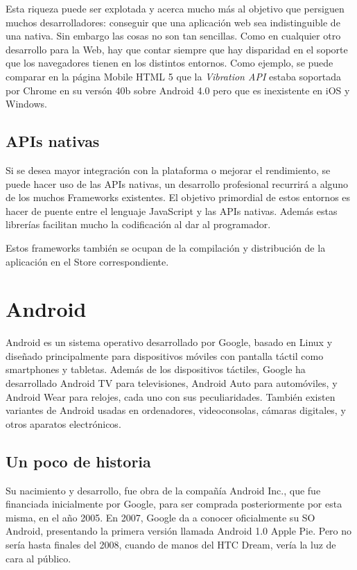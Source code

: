 \documentclass[
10pt, %
a4paper, %
oneside, %
headinclude,footinclude, %
BCOR5mm, %
]{scrartcl}
\begin{document}
Esta riqueza puede ser explotada y acerca mucho más al objetivo que persiguen muchos desarrolladores: conseguir que una aplicación web sea indistinguible de una nativa. Sin embargo las cosas no son tan sencillas. Como en cualquier otro desarrollo para la Web, hay que contar siempre que hay disparidad en el soporte que los navegadores tienen en los distintos entornos. Como ejemplo, se puede comparar en la página Mobile HTML 5 \cite{maximiliano_firtman_html5_2015} que la \textit{Vibration API} estaba soportada por Chrome en su versón 40b sobre Android 4.0 pero que es inexistente en iOS y Windows.

\subsection{APIs nativas}
Si se desea mayor integración con la plataforma o mejorar el rendimiento, se puede hacer uso de las APIs nativas, un desarrollo profesional recurrirá a alguno de los muchos Frameworks existentes. El objetivo primordial de estos entornos es hacer de puente entre el lenguaje JavaScript y las APIs nativas. Además estas librerías facilitan mucho la codificación al dar al programador.

Estos frameworks también se ocupan de la compilación y distribución de la aplicación en el Store correspondiente.

\section{Android}
Android es un sistema operativo desarrollado por Google, basado en Linux y diseñado principalmente para dispositivos móviles con pantalla táctil como smartphones y tabletas. Además de los dispositivos táctiles, Google ha desarrollado Android TV para televisiones, Android Auto para automóviles, y Android Wear para relojes, cada uno con sus peculiaridades. También existen variantes de Android usadas en ordenadores, videoconsolas, cámaras digitales, y otros aparatos electrónicos.

\subsection{Un poco de historia}
Su nacimiento y desarrollo, fue obra de la compañía Android Inc., que fue financiada inicialmente por Google, para ser comprada posteriormente por esta misma, en el año 2005. En 2007, Google da a conocer oficialmente su SO Android, presentando la primera versión llamada Android 1.0 Apple Pie. Pero no sería hasta finales del 2008, cuando de manos del HTC Dream, vería la luz de cara al público. 
\end{document}
